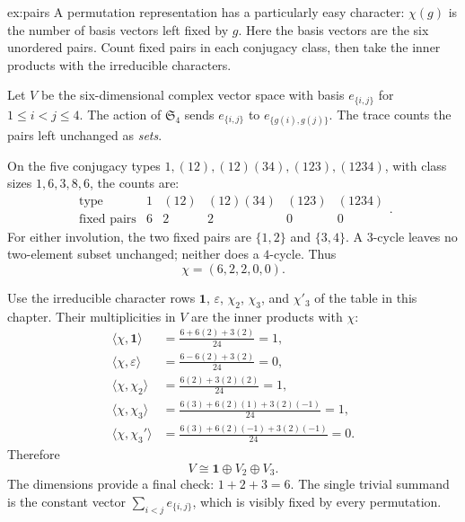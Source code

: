 \begin{solution}{ex:pairs}
\idea A permutation representation has a particularly easy character: $\chi(g)$ is the number of basis vectors left fixed by $g$. Here the basis vectors are the six unordered pairs. Count fixed pairs in each conjugacy class, then take the inner products with the irreducible characters.

\writeup Let $V$ be the six-dimensional complex vector space with basis $e_{\{i,j\}}$ for $1\le i<j\le4$. The action of $\mathfrak S_4$ sends $e_{\{i,j\}}$ to $e_{\{g(i),g(j)\}}$. The trace counts the pairs left unchanged as \emph{sets}.

On the five conjugacy types $1,(12),(12)(34),(123),(1234)$, with class sizes $1,6,3,8,6$, the counts are:
\[
\begin{array}{c|ccccc}
\text{type}&1&(12)&(12)(34)&(123)&(1234)\\\hline
\text{fixed pairs}&6&2&2&0&0
\end{array}.
\]
For either involution, the two fixed pairs are $\{1,2\}$ and $\{3,4\}$. A $3$-cycle leaves no two-element subset unchanged; neither does a $4$-cycle. Thus
\[
\chi=(6,2,2,0,0).
\]

Use the irreducible character rows $\mathbf1$, $\varepsilon$, $\chi_2$, $\chi_3$, and $\chi'_3$ of the table in this chapter. Their multiplicities in $V$ are the inner products with $\chi$:
\[
\begin{aligned}
\langle\chi,\mathbf1\rangle&=\frac{6+6(2)+3(2)}{24}=1,\\
\langle\chi,\varepsilon\rangle&=\frac{6-6(2)+3(2)}{24}=0,\\
\langle\chi,\chi_2\rangle&=\frac{6(2)+3(2)(2)}{24}=1,\\
\langle\chi,\chi_3\rangle&=\frac{6(3)+6(2)(1)+3(2)(-1)}{24}=1,\\
\langle\chi,\chi_3'\rangle&=\frac{6(3)+6(2)(-1)+3(2)(-1)}{24}=0.
\end{aligned}
\]
Therefore
\[
V\cong\mathbf1\oplus V_2\oplus V_3.
\]
The dimensions provide a final check: $1+2+3=6$. The single trivial summand is the constant vector $\sum_{i<j}e_{\{i,j\}}$, which is visibly fixed by every permutation.
\end{solution}

